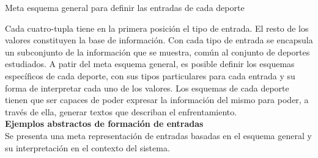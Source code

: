 \begin{table}[]
\begin{center}
    \end{center}
    \caption{Meta esquema general para definir las entradas de cada deporte}
    \label{tab:esquema_general}
\end{table}

    Cada cuatro-tupla tiene en la primera posición el tipo de entrada. El resto de los valores constituyen la base de información. Con cada tipo de entrada 
se encapsula un subconjunto de la información que se muestra, común al conjunto de deportes estudiados. 
    A patir del meta esquema general, es posible definir los esquemas específicos de cada deporte, con sus tipos particulares para cada entrada y su forma de interpretar 
cada uno de los valores. Los esquemas de cada deporte tienen que ser capaces de poder expresar la información del mismo para poder, a través de ella, 
generar textos que describan el enfrentamiento. \\


    \textbf{Ejemplos abstractos de formación de entradas}\\

    Se presenta una meta representación de entradas basadas en el esquema general y su interpretación en el contexto del sistema.

